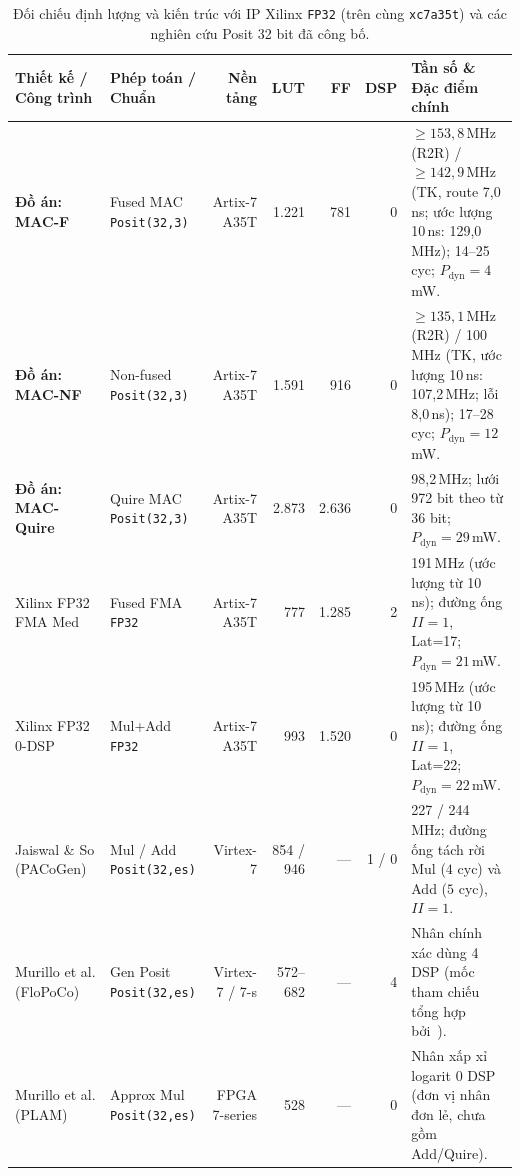 \begin{table}[!htbp]
  \centering
  \caption{Đối chiếu định lượng và kiến trúc với IP Xilinx \texttt{FP32} (trên cùng \texttt{xc7a35t}) và các nghiên cứu Posit 32 bit đã công bố.}
  \label{tab:literature-comparison}
  \footnotesize
  \setlength{\tabcolsep}{2.8pt}
  \renewcommand{\arraystretch}{1.04}
  \begin{tabularx}{\textwidth}{@{}>{\raggedright\arraybackslash}p{29mm} >{\raggedright\arraybackslash}p{24mm} r r r r Y@{}}
    \toprule
    \textbf{Thiết kế / Công trình} & \textbf{Phép toán / Chuẩn} & \textbf{Nền tảng} & \textbf{LUT} & \textbf{FF} & \textbf{DSP} & \textbf{Tần số \& Đặc điểm chính} \\
    \midrule
    \textbf{Đồ án: MAC-F} & Fused MAC \texttt{Posit(32,3)} & Artix-7 A35T & 1.221 & 781 & 0 & $\ge 153{,}8$\,MHz (R2R) / $\ge 142{,}9$\,MHz (TK, route 7,0\,ns; ước lượng 10\,ns: 129,0\,MHz); 14--25 cyc; $P_{\mathrm{dyn}}=4$\,mW. \\
    \textbf{Đồ án: MAC-NF} & Non-fused \texttt{Posit(32,3)} & Artix-7 A35T & 1.591 & 916 & 0 & $\ge 135{,}1$\,MHz (R2R) / 100\,MHz (TK, ước lượng 10\,ns: 107,2\,MHz; lỗi 8,0\,ns); 17--28 cyc; $P_{\mathrm{dyn}}=12$\,mW. \\
    \textbf{Đồ án: MAC-Quire} & Quire MAC \texttt{Posit(32,3)} & Artix-7 A35T & 2.873 & 2.636 & 0 & 98,2\,MHz; lưới 972 bit theo từ 36 bit; $P_{\mathrm{dyn}}=29$\,mW. \\
    \midrule
    Xilinx FP32 FMA Med~\cite{amd_pg060_fp} & Fused FMA \texttt{FP32} & Artix-7 A35T & 777 & 1.285 & 2 & 191\,MHz (ước lượng từ 10\,ns); đường ống $II=1$, Lat=17; $P_{\mathrm{dyn}}=21$\,mW. \\
    Xilinx FP32 0-DSP~\cite{amd_pg060_fp} & Mul+Add \texttt{FP32} & Artix-7 A35T & 993 & 1.520 & 0 & 195\,MHz (ước lượng từ 10\,ns); đường ống $II=1$, Lat=22; $P_{\mathrm{dyn}}=22$\,mW. \\
    \midrule
    Jaiswal \& So (PACoGen)~\cite{jaiswal2019pacogen} & Mul / Add \texttt{Posit(32,es)} & Virtex-7 & 854 / 946 & --- & 1 / 0 & 227 / 244\,MHz; đường ống tách rời Mul ($4$ cyc) và Add ($5$ cyc), $II=1$. \\
    Murillo et al. (FloPoCo)~\cite{murillo2020flopoco,murillo2022energy} & Gen Posit \texttt{Posit(32,es)} & Virtex-7 / 7-s & 572--682 & --- & 4 & Nhân chính xác dùng 4 DSP (mốc tham chiếu tổng hợp bởi~\cite{murillo2021plam}). \\
    Murillo et al. (PLAM)~\cite{murillo2021plam} & Approx Mul \texttt{Posit(32,es)} & FPGA 7-series & 528 & --- & 0 & Nhân xấp xỉ logarit $0$ DSP (đơn vị nhân đơn lẻ, chưa gồm Add/Quire). \\

\end{tabularx}
\end{table}
